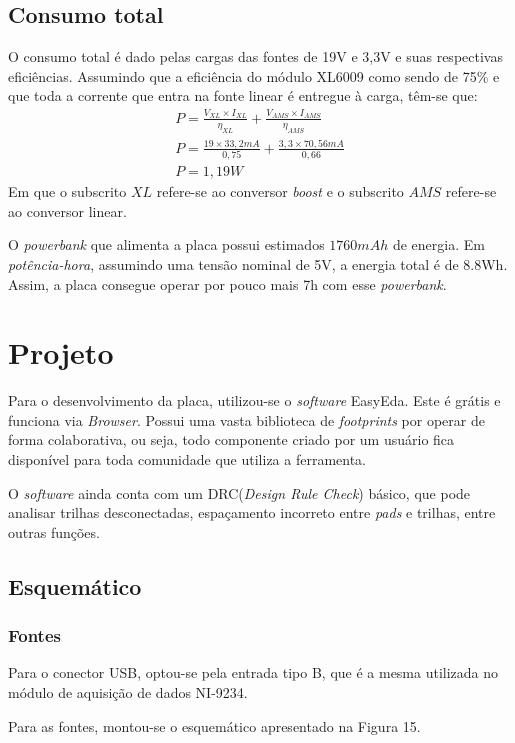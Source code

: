 \documentclass[11pt]{abntex2}
\begin{document}
		\section{Consumo total}
			O consumo total é dado pelas cargas das fontes de 19V e 3,3V e
			suas respectivas eficiências. Assumindo que a eficiência do
			módulo XL6009 como sendo de 75\% e que toda a corrente que entra
			na fonte linear é entregue à carga, têm-se que:
			\begin{gather*}
				P = \frac{V_{XL}\times I_{XL}}{\eta _{XL}} + \frac{V_{AMS}\times I_{AMS}}{\eta _{AMS}}\\
				P = \frac{19\times 33,2mA}{0,75} + \frac{3,3\times 70,56mA}{0,66}\\
				P = 1,19W
			\end{gather*}
			Em que o subscrito $XL$ refere-se ao conversor \textit{boost} e
			o subscrito $AMS$ refere-se ao conversor linear.

			O \textit{powerbank} que alimenta a placa possui estimados $1760mAh$ de
			energia. Em \textit{potência-hora}, assumindo uma tensão nominal
			de 5V, a energia total é de 8.8Wh. Assim, a placa consegue operar
			por pouco mais 7h com esse \textit{powerbank}.

		\chapter{Projeto}
			Para o desenvolvimento da placa, utilizou-se o \textit{software}
			EasyEda. Este é grátis e funciona via \textit{Browser}. Possui uma
			vasta biblioteca de \textit{footprints} por operar de forma
			colaborativa, ou seja, todo componente criado por um usuário fica
			disponível para toda comunidade que utiliza a ferramenta.

			O \textit{software} ainda conta com um DRC(\textit{Design Rule
			Check}) básico, que pode analisar trilhas desconectadas, espaçamento
			incorreto entre \textit{pads} e trilhas, entre outras funções.
			\section{Esquemático}
				\subsection{Fontes}
					Para o conector USB, optou-se pela entrada tipo B, que é a
					mesma utilizada no módulo de aquisição de dados NI-9234.

					Para as fontes, montou-se o esquemático apresentado na Figura 15.
\end{document}
